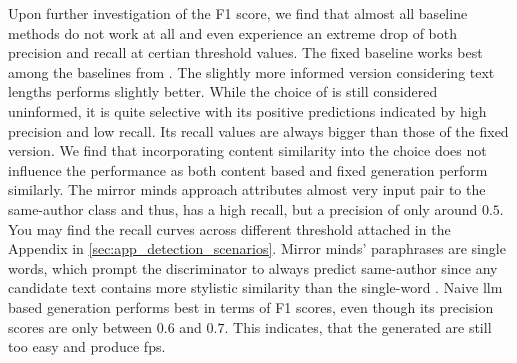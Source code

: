 Upon further investigation of the F1 score, we find that almost all baseline methods do not work at all and even experience an extreme drop of both precision and recall at certian threshold values.
The fixed baseline works best among the baselines from \citet{koppel_determining_2014}.
The slightly more informed version considering text lengths performs slightly better.
While the choice of \imps{} is still considered uninformed, it is quite selective with its positive predictions indicated by high precision and low recall. 
Its recall values are always bigger than those of the fixed version.
We find that incorporating content similarity into the \imp{} choice does not influence the performance as both content based and fixed \imp{} generation perform similarly.
The mirror minds approach attributes almost very input pair to the same-author class and thus, has a high recall, but a precision of only around $0.5$.
You may find the recall curves across different threshold attached in the Appendix in \autoref{sec:app_detection_scenarios}.
Mirror minds' paraphrases are single words, which prompt the discriminator to always predict same-author since any candidate text contains more stylistic similarity than the single-word \imps{}.
Naive \ac{llm} based \imp{} generation performs best in terms of F1 scores, even though its precision scores are only between $0.6$ and $0.7$.
This indicates, that the generated \imps{} are still too easy and produce \acp{fp}.



%     


%     
